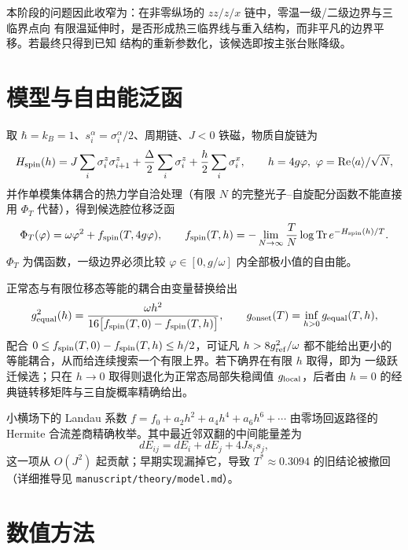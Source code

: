 \documentclass[UTF8,11pt,a4paper]{ctexart}
\begin{document}
本阶段的问题因此收窄为：在非零纵场的 $zz/z/x$ 链中，零温一级/二级边界与三临界点向
有限温延伸时，是否形成热三临界线与重入结构，而非平凡的边界平移。若最终只得到已知
结构的重新参数化，该候选即按主张台账降级。

\section{模型与自由能泛函}

取 $\hbar=k_B=1$、$s_i^\alpha=\sigma_i^\alpha/2$、周期链、$J<0$ 铁磁，物质自旋链为
\begin{equation}
  H_{\rm spin}(h)=J\sum_i\sigma_i^z\sigma_{i+1}^z+\frac{\Delta}{2}\sum_i\sigma_i^z
  +\frac{h}{2}\sum_i\sigma_i^x,\qquad h=4g\varphi,\ \varphi=\mathrm{Re}\langle a\rangle/\sqrt N,
  \label{eq:Hspin}
\end{equation}
并作单模集体耦合的热力学自洽处理（有限 $N$ 的完整光子--自旋配分函数不能直接用
$\Phi_T$ 代替），得到候选腔位移泛函
\begin{equation}
  \Phi_T(\varphi)=\omega\varphi^2+f_{\rm spin}(T,4g\varphi),\qquad
  f_{\rm spin}(T,h)=-\lim_{N\to\infty}\frac{T}{N}\log\operatorname{Tr}e^{-H_{\rm spin}(h)/T}.
  \label{eq:Phi}
\end{equation}
$\Phi_T$ 为偶函数，一级边界必须比较 $\varphi\in[0,g/\omega]$ 内全部极小值的自由能。

正常态与有限位移态等能的耦合由变量替换给出
\begin{equation}
  g_{\rm equal}^2(h)=\frac{\omega h^2}{16\big[f_{\rm spin}(T,0)-f_{\rm spin}(T,h)\big]},
  \qquad g_{\rm onset}(T)=\inf_{h>0}g_{\rm equal}(T,h),
  \label{eq:gequal}
\end{equation}
配合 $0\le f_{\rm spin}(T,0)-f_{\rm spin}(T,h)\le h/2$，可证凡 $h>8g_{\rm ref}^2/\omega$
都不能给出更小的等能耦合，从而给连续搜索一个有限上界。若下确界在有限 $h$ 取得，即为
一级跃迁候选；只在 $h\to0$ 取得则退化为正常态局部失稳阈值 $g_{\rm local}$，后者由
$h=0$ 的经典链转移矩阵与三自旋概率精确给出。

小横场下的 Landau 系数 $f=f_0+a_2h^2+a_4h^4+a_6h^6+\cdots$ 由零场回返路径的 Hermite
合流差商精确枚举。其中最近邻双翻的中间能量差为
\begin{equation}
  dE_{ij}=dE_i+dE_j+4J s_i s_j,
  \label{eq:dEij}
\end{equation}
这一项从 $O(J^2)$ 起贡献；早期实现漏掉它，导致 $T^\ast\approx0.3094$ 的旧结论被撤回
（详细推导见 \texttt{manuscript/theory/model.md}）。

\section{数值方法}
\end{document}
